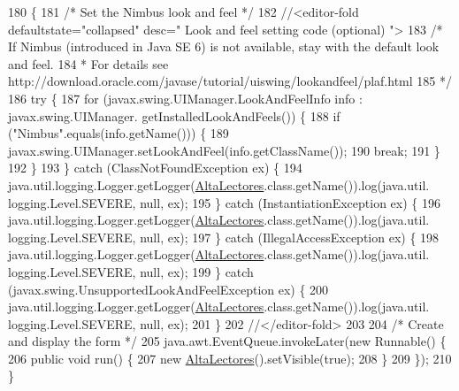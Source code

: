 \begin{DoxyCode}
180                                            \{
181         \textcolor{comment}{/* Set the Nimbus look and feel */}
182         \textcolor{comment}{//<editor-fold defaultstate="collapsed" desc=" Look and feel setting code (optional) ">}
183         \textcolor{comment}{/* If Nimbus (introduced in Java SE 6) is not available, stay with the default look and feel.}
184 \textcolor{comment}{         * For details see http://download.oracle.com/javase/tutorial/uiswing/lookandfeel/plaf.html }
185 \textcolor{comment}{         */}
186         \textcolor{keywordflow}{try} \{
187             \textcolor{keywordflow}{for} (javax.swing.UIManager.LookAndFeelInfo info : javax.swing.UIManager.
      getInstalledLookAndFeels()) \{
188                 \textcolor{keywordflow}{if} (\textcolor{stringliteral}{"Nimbus"}.equals(info.getName())) \{
189                     javax.swing.UIManager.setLookAndFeel(info.getClassName());
190                     \textcolor{keywordflow}{break};
191                 \}
192             \}
193         \} \textcolor{keywordflow}{catch} (ClassNotFoundException ex) \{
194             java.util.logging.Logger.getLogger(\mbox{\hyperlink{class_interfaz_package_1_1_alta_lectores_a3cec38f19ea0fbf8c48d9af5911441de}{AltaLectores}}.class.getName()).log(java.util.
      logging.Level.SEVERE, null, ex);
195         \} \textcolor{keywordflow}{catch} (InstantiationException ex) \{
196             java.util.logging.Logger.getLogger(\mbox{\hyperlink{class_interfaz_package_1_1_alta_lectores_a3cec38f19ea0fbf8c48d9af5911441de}{AltaLectores}}.class.getName()).log(java.util.
      logging.Level.SEVERE, null, ex);
197         \} \textcolor{keywordflow}{catch} (IllegalAccessException ex) \{
198             java.util.logging.Logger.getLogger(\mbox{\hyperlink{class_interfaz_package_1_1_alta_lectores_a3cec38f19ea0fbf8c48d9af5911441de}{AltaLectores}}.class.getName()).log(java.util.
      logging.Level.SEVERE, null, ex);
199         \} \textcolor{keywordflow}{catch} (javax.swing.UnsupportedLookAndFeelException ex) \{
200             java.util.logging.Logger.getLogger(\mbox{\hyperlink{class_interfaz_package_1_1_alta_lectores_a3cec38f19ea0fbf8c48d9af5911441de}{AltaLectores}}.class.getName()).log(java.util.
      logging.Level.SEVERE, null, ex);
201         \}
202         \textcolor{comment}{//</editor-fold>}
203 
204         \textcolor{comment}{/* Create and display the form */}
205         java.awt.EventQueue.invokeLater(\textcolor{keyword}{new} Runnable() \{
206             \textcolor{keyword}{public} \textcolor{keywordtype}{void} run() \{
207                 \textcolor{keyword}{new} \mbox{\hyperlink{class_interfaz_package_1_1_alta_lectores_a3cec38f19ea0fbf8c48d9af5911441de}{AltaLectores}}().setVisible(\textcolor{keyword}{true});
208             \}
209         \});
210     \}
\end{DoxyCode}


